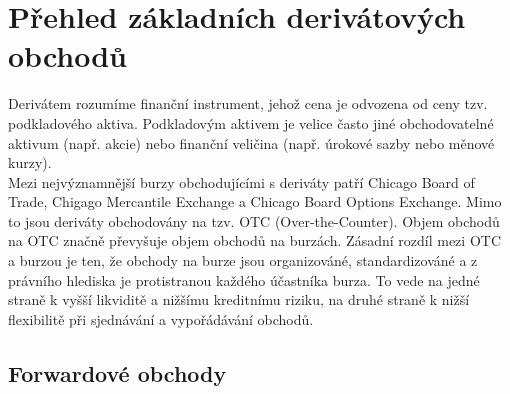 \documentclass[a4paper]{book}
\begin{document}
\tableofcontents

\chapter{Přehled základních derivátových obchodů}

Derivátem rozumíme finanční instrument, jehož cena je odvozena od ceny tzv. podkladového aktiva. Podkladovým aktivem je velice často jiné obchodovatelné aktivum (např. akcie) nebo finanční veličina (např. úrokové sazby nebo měnové kurzy).\\

\noindent Mezi nejvýznamnější burzy obchodujícími s deriváty patří Chicago Board of Trade, Chigago Mercantile Exchange a Chicago Board Options Exchange. Mimo to jsou deriváty obchodovány na tzv. OTC (Over-the-Counter). Objem obchodů na OTC značně převyšuje objem obchodů na burzách. Zásadní rozdíl mezi OTC a burzou je ten, že obchody na burze jsou organizováné, standardizováné a z právního hlediska je protistranou každého účastníka burza. To vede na jedné straně k vyšší likviditě a nižšímu kreditnímu riziku, na druhé straně k nižší flexibilitě při sjednávání a vypořádávání obchodů.

\section{Forwardové obchody}
\end{document}
